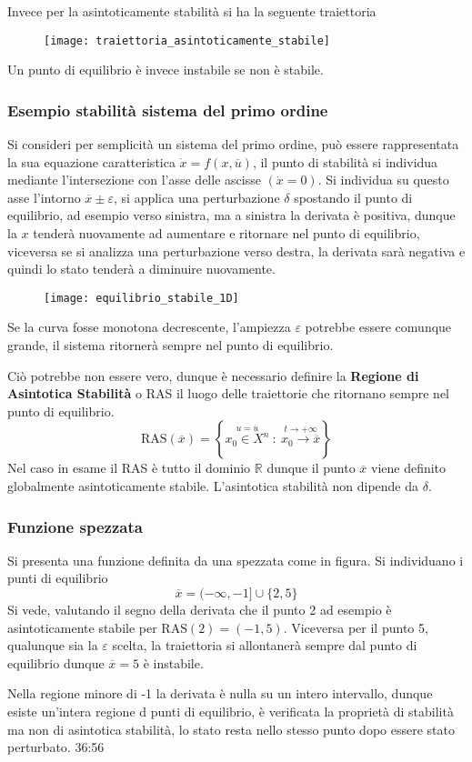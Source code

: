 Invece per la asintoticamente stabilità si ha la seguente traiettoria
\begin{figure}[h]
\centering
\texttt{[image: traiettoria\_asintoticamente\_stabile]}
\end{figure}

Un punto di equilibrio è invece instabile se non è stabile.

\newpage
\subsubsection{Esempio stabilità sistema del primo ordine}
Si consideri per semplicità un sistema del primo ordine, può essere
rappresentata la sua equazione caratteristica
$\dot{x} = f(x,\overline{u})$, il punto di stabilità si individua mediante
l'intersezione con l'asse delle ascisse $(\dot{x}=0)$. Si individua su questo
asse l'intorno $\overline{x} \pm \varepsilon$,
si applica una perturbazione $\delta$ spostando il punto di equilibrio, ad
esempio verso sinistra, ma a sinistra la derivata è positiva, dunque la $x$
tenderà nuovamente ad aumentare e ritornare nel punto di equilibrio, viceversa
se si analizza una perturbazione verso destra, la
derivata sarà negativa e quindi lo stato tenderà a diminuire nuovamente.
\begin{figure}[h]
\centering
\texttt{[image: equilibrio\_stabile\_1D]}
\end{figure}
Se la curva fosse monotona decrescente, l'ampiezza $\varepsilon$ potrebbe
essere comunque grande, il sistema ritornerà sempre nel punto di
equilibrio.

Ciò potrebbe non essere vero, dunque è necessario definire la \textbf{Regione
di Asintotica Stabilità} o RAS il luogo delle traiettorie che ritornano sempre
nel punto di equilibrio.
$$
\text{RAS}(\overline{x})=\left\{ \stackrel{u=\overline{u}}{x_0\in X^n}
\ :\ \stackrel{t\to+\infty}{ x_0 \to \overline{x} }\right\}
$$
Nel caso in esame il RAS è tutto il dominio $\mathbb{R}$ dunque il punto
$\overline{x}$ viene definito globalmente asintoticamente stabile.
L'asintotica stabilità non dipende da $\delta$.

\subsubsection{Funzione spezzata}
Si presenta una funzione definita da una spezzata come in figura.
Si individuano i punti di equilibrio
$$
\overline{x} = (-\infty,-1] \cup \{2,5\}
$$
Si vede, valutando il segno della derivata che il punto 2 ad esempio è
asintoticamente stabile per $\text{RAS}(2) = (-1,5)$.
Viceversa per il punto 5, qualunque sia la $\varepsilon$ scelta, la traiettoria
si allontanerà sempre dal punto di equilibrio dunque $\overline{x}=5$ è
instabile.

Nella regione  minore di -1 la derivata è nulla su un intero intervallo, dunque
esiste un'intera regione d punti di equilibrio, è verificata la proprietà di
stabilità ma non di asintotica stabilità, lo stato resta nello stesso punto
dopo essere stato perturbato.
36:56
